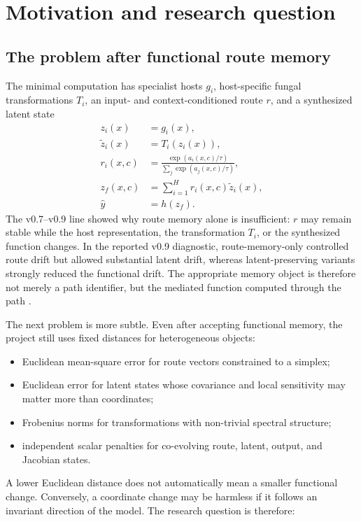 \section{Motivation and research question}

\subsection{The problem after functional route memory}
The minimal \MMALS{} computation has specialist hosts $g_i$, host-specific fungal transformations $T_i$, an input- and context-conditioned route $r$, and a synthesized latent state
\begin{align}
  z_i(x) &= g_i(x), \\
  \tilde z_i(x) &= T_i(z_i(x)), \\
  r_i(x,c) &= \frac{\exp(a_i(x,c)/\tau)}{\sum_j \exp(a_j(x,c)/\tau)}, \\
  z_f(x,c) &= \sum_{i=1}^{H} r_i(x,c)\tilde z_i(x), \\
  \hat y &= h(z_f).
  \label{eq:mmals-basic}
\end{align}
The v0.7--v0.9 line showed why route memory alone is insufficient: $r$ may remain stable while the host representation, the transformation $T_i$, or the synthesized function changes. In the reported v0.9 diagnostic, route-memory-only controlled route drift but allowed substantial latent drift, whereas latent-preserving variants strongly reduced the functional drift. The appropriate memory object is therefore not merely a path identifier, but the mediated function computed through the path \citep{harbonnier2026v09,harbonnier2026v08}.

The next problem is more subtle. Even after accepting functional memory, the project still uses fixed distances for heterogeneous objects:
\begin{itemize}[leftmargin=1.5em]
  \item Euclidean mean-square error for route vectors constrained to a simplex;
  \item Euclidean error for latent states whose covariance and local sensitivity may matter more than coordinates;
  \item Frobenius norms for transformations with non-trivial spectral structure;
  \item independent scalar penalties for co-evolving route, latent, output, and Jacobian states.
\end{itemize}
A lower Euclidean distance does not automatically mean a smaller functional change. Conversely, a coordinate change may be harmless if it follows an invariant direction of the model. The research question is therefore:

